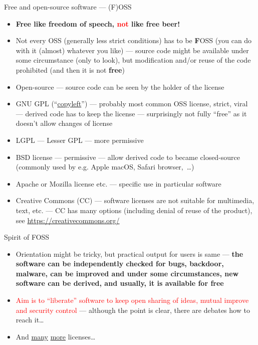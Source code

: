 \documentclass[compress, ucs, xelatex, 11pt, xcolor=svgnames,
  hyperref={
    bookmarks=true,
    unicode=true,
    colorlinks=true,
    pdftitle={Linux, command line and MetaCentrum},
    plainpages=false,
    pdfauthor={Vojtech Zeisek},
    pdfsubject={Course about use of Linux command line, writing shell scripts and using MetaCentrum of CESNET},
    pdfcreator={XeLaTeX},
    pdfkeywords={Linux, GNU, BASH, shell, command line, MetaCentrum},
    linkcolor=DarkRed,
    anchorcolor=DarkBlue,
    citecolor=Indigo,
    filecolor=NavyBlue,
    menucolor=DarkMagenta,
    urlcolor=DarkBlue,
    pdftex},
  url={hyphens, lowtilde} %
  ]{beamer}
\renewcommand{\alert}[1]{\textcolor{red}{#1}}
\begin{document}
\begin{frame}[allowframebreaks]{Free and open-source software --- (F)OSS}
  \begin{itemize}
    \item \textbf{Free like freedom of speech, \alert{not} like free beer!}
    \item Not every OSS (generally less strict conditions) has to be \textbf{F}OSS (you can do with it (almost) whatever you like) --- source code might be available under some circumstance (only to look), but modification and/or reuse of the code prohibited (and then it is not \textbf{free})
    \item Open-source --- source code can be seen by the holder of the license
    \item GNU GPL (``\href{https://www.gnu.org/copyleft/}{copyleft}'') --- probably most common OSS license, strict, viral --- derived code has to keep the license --- surprisingly not fully ``free'' as it doesn't allow changes of license
    \item LGPL --- Lesser GPL --- more permissive
    \item BSD license --- permissive --- allow derived code to became closed-source (commonly used by e.g. Apple macOS, Safari browser,~\ldots)
    \item Apache or Mozilla license etc. --- specific use in particular software
    \item Creative Commons (CC) --- software licenses are not suitable for multimedia, text, etc. --- CC has many options (including denial of reuse of the product), see \url{https://creativecommons.org/}
  \end{itemize}
  \begin{block}{Spirit of FOSS}
    \begin{itemize}
      \item Orientation might be tricky, but practical output for users is same --- \textbf{the software can be independently checked for bugs, backdoor, malware, can be improved and under some circumstances, new software can be derived, and usually, it is available for free}
      \item \alert{Aim is to ``liberate'' software to keep open sharing of ideas, mutual improve and security control} --- although the point is clear, there are debates how to reach it\ldots
    \end{itemize}
  \end{block}
  \begin{itemize}
    \item And \href{https://en.wikipedia.org/wiki/Comparison_of_free_and_open-source_software_licenses}{many} \href{https://opensource.org/licenses}{more} licenses\ldots
  \end{itemize}
\end{frame}
\end{document}
